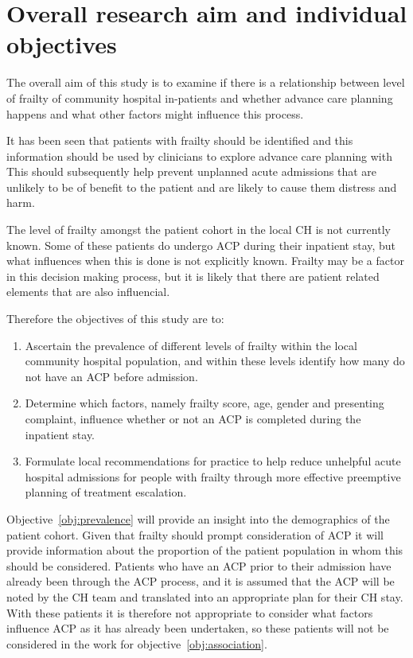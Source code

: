 \documentclass
[
	12pt,
	a4paper,
	oneside,
]{report}
\begin{document}






\section{Overall research aim and individual objectives}

The overall aim of this study is to examine if there is a relationship 
between
level of frailty of community hospital in-patients and whether advance care planning
happens and what other factors might influence this process.

It has been seen that patients with frailty should be identified and this 
information should be used by clinicians to explore advance care planning with 
This should subsequently help prevent unplanned acute admissions that are 
unlikely to be of benefit to the patient and are likely to cause them distress 
and harm.

The level of frailty amongst the patient cohort in the local CH is not currently
known. Some of these patients do undergo ACP during their inpatient stay, but what 
influences when this is done is not explicitly known. Frailty may be a factor
in this decision making process, but it is likely that there are patient 
related elements that are also influencial.

Therefore the objectives of this study are to:
\begin{enumerate}
\item	Ascertain the prevalence of different levels of frailty within the local 
		community hospital population, and within these levels identify 
		how many do not have an ACP before admission.\label{obj:prevalence}
\item	Determine which factors, namely frailty score, age, gender and
		presenting complaint, influence whether or not an ACP is 
		completed during the inpatient stay.\label{obj:association}
\item	Formulate local recommendations for practice to help reduce unhelpful
		acute hospital admissions for people with frailty through more 
		effective preemptive planning of treatment escalation.
		\label{obj:recommend}
\end{enumerate}

Objective~\ref{obj:prevalence} will provide an insight into the demographics
of the patient cohort. Given that frailty should prompt consideration of ACP
it will provide information about the proportion of the patient population in
whom this should be considered. Patients who have an ACP prior to their admission
have already been through the ACP process, and it is assumed that the ACP will be 
noted by the CH team and translated into an appropriate plan for their CH stay.
With these patients it is therefore not appropriate to consider what factors 
influence ACP as it has already been undertaken, so these patients will not
be considered in the work for objective~\ref{obj:association}.
\end{document}
